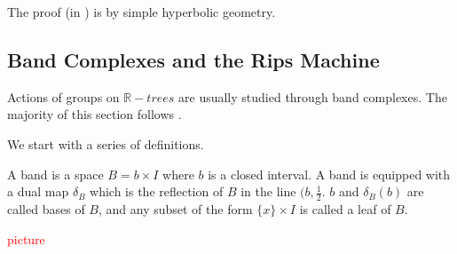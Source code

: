 The proof (in \cite{Bestvina2}) is by simple hyperbolic geometry.



    

\subsection{Band Complexes and the Rips Machine}
Actions of groups on $\mathbb{R}-trees$ are usually studied through band complexes. The majority of this section follows \cite{Wilton}.

We start with a series of definitions.
\begin{definition}
    A \textnormal{band} is a space $B=b\times I$ where $b$ is a closed interval. A band is equipped with a \textnormal{dual map} $\delta_B$ which is the reflection of $B$ in the line $(b,\frac{1}{2}$. $b$ and $\delta_B(b)$ are called \textnormal{bases} of $B$, and any subset of the form $\{x\}\times I$ is called a \textnormal{leaf} of $B$.
\end{definition}
\textcolor{red}{picture}


